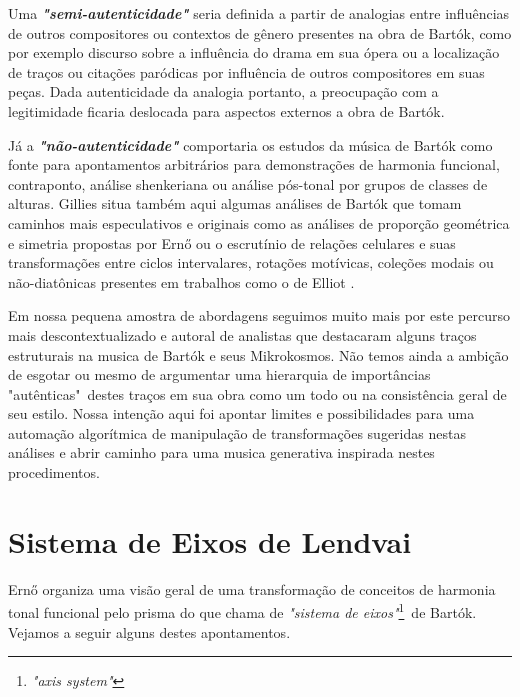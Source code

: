 \documentclass[
	12pt,				%
	openright,			%
	twoside,			%
	a4paper,			%
	english,			%
	french,				%
	spanish,			%
	brazil				%
	]{abntex2}
\begin{document}
Uma \textit{\textbf{"semi-autenticidade"}} seria definida a partir de analogias entre influências de outros compositores ou contextos de gênero presentes na obra de Bartók, como por exemplo discurso sobre a influência do drama em sua ópera ou a localização de traços ou citações paródicas por influência de outros compositores em suas peças. Dada autenticidade da analogia portanto, a preocupação com a legitimidade ficaria deslocada para aspectos externos a obra de Bartók.

Já a \textit{\textbf{"não-autenticidade"}} comportaria os estudos da música de Bartók como fonte para apontamentos arbitrários para demonstrações de harmonia funcional, contraponto, análise shenkeriana ou análise pós-tonal por grupos de classes de alturas. Gillies situa também aqui algumas análises de Bartók que tomam caminhos mais especulativos e originais como as análises de proporção geométrica e simetria propostas por Ern{\H{o}}   ou o escrutínio de relações celulares e suas transformações entre ciclos intervalares, rotações motívicas, coleções modais ou não-diatônicas presentes em trabalhos como o de Elliot . 

Em nossa pequena amostra de abordagens seguimos muito mais por este percurso mais descontextualizado e autoral de analistas que destacaram alguns traços estruturais na musica de Bartók e seus Mikrokosmos. Não temos ainda a ambição de esgotar ou mesmo de argumentar uma hierarquia de importâncias "autênticas"\ destes traços em sua obra como um todo ou na consistência geral de seu estilo. Nossa intenção aqui foi apontar limites e possibilidades para uma automação algorítmica de manipulação de transformações sugeridas nestas análises e abrir caminho para uma musica generativa inspirada nestes procedimentos.

\section{Sistema de Eixos de Lendvai}
\label{lendvai_eixos}

Ern{\H{o}}  organiza uma visão geral de uma transformação de conceitos de harmonia tonal funcional pelo prisma do que chama de \textit{"sistema de eixos"}\footnote{\textit{"axis system"}}\ de Bartók. Vejamos a seguir alguns destes apontamentos. \pagebreak

\end{document}
